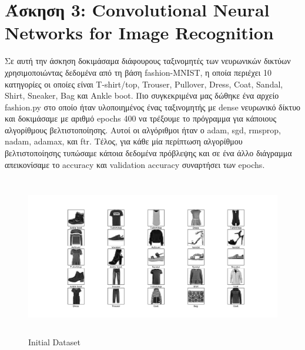 \documentclass{article}
\begin{document}
\section*{Άσκηση 3: Convolutional Neural Networks for Image Recognition}
	Σε αυτή την άσκηση δοκιμάσαμα διάφουρους ταξινομητές των νευρωνικών δικτύων χρησιμοποιώντας δεδομένα από τη βάση fashion-MNIST, η οποία περιέχει 10 κατηγορίες οι οποίες είναι T-shirt/top,
	Trouser, Pullover, Dress, Coat, Sandal, Shirt, Sneaker, Bag και Ankle boot. Πιο συγκεκριμένα μας δώθηκε ένα αρχείο fashion.py στο οποίο ήταν υλοποιημένος ένας ταξινομητής με dense νευρωνικό δίκτυο και δοκιμάσαμε με αριθμό epochs 400 να τρέξουμε το πρόγραμμα για κάποιους αλγορίθμους βελτιστοποίησης. Αυτοί οι αλγόριθμοι ήταν ο adam, sgd, rmsprop, nadam, adamax, και ftr. Τέλος, για κάθε μία περίπτωση αλγορίθμου βελτιστοποίησης τυπώσαμε κάποια δεδομένα πρόβλεψης και σε ένα άλλο διάγραμμα απεικονίσαμε το accuracy και validation accuracy συναρτήσει των epochs.
	\begin{figure}[h!]
		\centering
		\includegraphics[height=7cm,width=\linewidth]{../exercise3_3/images/dataset.png}
		\caption{Initial Dataset}
	\end{figure}
\end{document}
